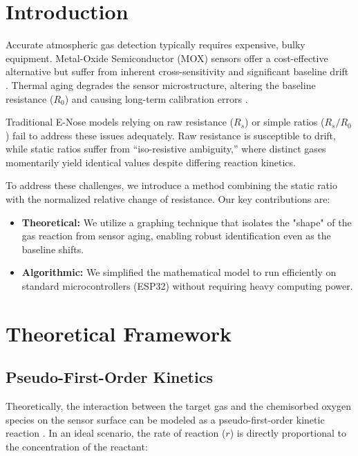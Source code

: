 \documentclass[conference]{IEEEtran}
\begin{document}
\section{Introduction}
Accurate atmospheric gas detection typically requires expensive, bulky equipment. Metal-Oxide Semiconductor (MOX) sensors offer a cost-effective alternative \cite{pearce2003handbook} but suffer from inherent cross-sensitivity and significant baseline drift \cite{yamazoe2009new}. Thermal aging degrades the sensor microstructure, altering the baseline resistance ($R_0$) and causing long-term calibration errors \cite{korotcenkov2012instability}.

Traditional E-Nose models relying on raw resistance ($R_s$) or simple ratios ($R_s/R_0$) \cite{yan2015enose} fail to address these issues adequately. Raw resistance is susceptible to drift, while static ratios suffer from ``iso-resistive ambiguity,'' where distinct gases momentarily yield identical values despite differing reaction kinetics.

To address these challenges, we introduce a method combining the static ratio with the normalized relative change of resistance. Our key contributions are:

\begin{itemize}
    \item \textbf{Theoretical:} We utilize a graphing technique that isolates the "shape" of the gas reaction from sensor aging, enabling robust identification even as the baseline shifts.
    \item \textbf{Algorithmic:} We simplified the mathematical model to run efficiently on standard microcontrollers (ESP32) without requiring heavy computing power.
\end{itemize}

\section{Theoretical Framework}

\subsection{Pseudo-First-Order Kinetics}
Theoretically, the interaction between the target gas and the chemisorbed oxygen species on the sensor surface can be modeled as a pseudo-first-order kinetic reaction \cite{atkins2018}. In an ideal scenario, the rate of reaction ($r$) is directly proportional to the concentration of the reactant:
\end{document}
